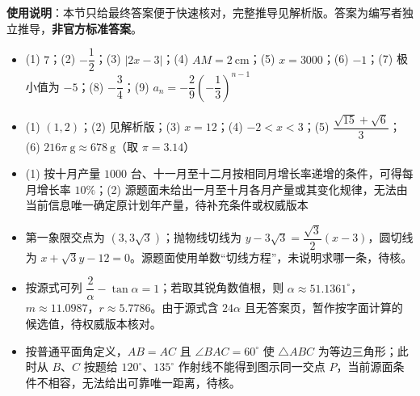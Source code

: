 
\begin{gknotice}
\textbf{使用说明}：本节只给最终答案便于快速核对，完整推导见解析版。答案为编写者独立推导，\textbf{非官方标准答案}。
\end{gknotice}

\begin{itemize}[leftmargin=2.6em]
  \item[\textbf{1.}] (1) $7$；(2) $-\dfrac12$；(3) $\lvert2x-3\rvert$；(4) $AM=2\ \mathrm{cm}$；(5) $x=3000$；(6) $-1$；(7) 极小值为 $-5$；(8) $-\dfrac34$；(9) $a_n=-\dfrac29\left(-\dfrac13\right)^{n-1}$
  \item[\textbf{2.}] (1) $(1,2)$；(2) 见解析版；(3) $x=12$；(4) $-2<x<3$；(5) $\dfrac{\sqrt{15}+\sqrt6}{3}$；(6) $216\pi\ \mathrm g\approx678\ \mathrm g$（取 $\pi=3.14$）
  \item[\textbf{3.}] (1) 按十月产量 $1000$ 台、十一月至十二月按相同月增长率递增的条件，可得每月增长率 $10\%$；(2) 源题面未给出一月至十月各月产量或其变化规律，无法由当前信息唯一确定原计划年产量，待补充条件或权威版本
  \item[\textbf{4.}] 第一象限交点为 $(3,3\sqrt3)$；抛物线切线为 $y-3\sqrt3=\dfrac{\sqrt3}{2}(x-3)$，圆切线为 $x+\sqrt3y-12=0$。源题面使用单数“切线方程”，未说明求哪一条，待核。
  \item[\textbf{5.}] 按源式可列 $\dfrac2\alpha-\tan\alpha=1$；若取其锐角数值根，则 $\alpha\approx51.1361^\circ$，$m\approx11.0987$，$r\approx5.7786$。由于源式含 $24\alpha$ 且无答案页，暂作按字面计算的候选值，待权威版本核对。
  \item[\textbf{6.}] 按普通平面角定义，$AB=AC$ 且 $\angle BAC=60^\circ$ 使 $\triangle ABC$ 为等边三角形；此时从 $B$、$C$ 按题给 $120^\circ$、$135^\circ$ 作射线不能得到图示同一交点 $P$，当前源面条件不相容，无法给出可靠唯一距离，待核。
\end{itemize}
